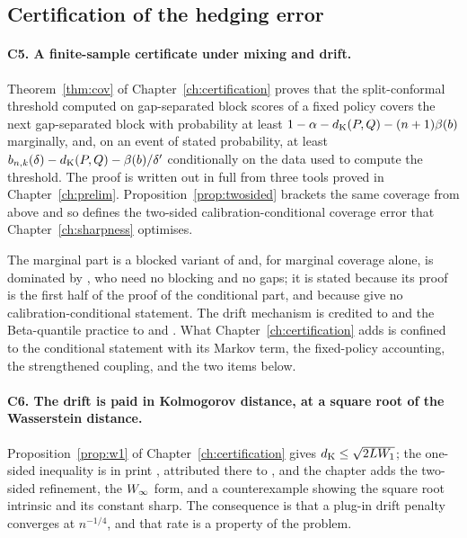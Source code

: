 \documentclass[../../../main.tex]{subfiles}
\begin{document}
\subsection{Certification of the hedging error}

\paragraph{C5. A finite-sample certificate under mixing and drift.} Theorem~\ref{thm:cov} of Chapter~\ref{ch:certification} proves that the split-conformal threshold computed on gap-separated block scores of a fixed policy covers the next gap-separated block with probability at least $1-\alpha-d_{\mathrm{K}}(P,Q)-(n+1)\beta(b)$ marginally, and, on an event of stated probability, at least $b_{n,k}(\delta)-d_{\mathrm{K}}(P,Q)-\beta(b)/\delta'$ conditionally on the data used to compute the threshold. The proof is written out in full from three tools proved in Chapter~\ref{ch:prelim}. Proposition~\ref{prop:twosided} brackets the same coverage from above and so defines the two-sided calibration-conditional coverage error that Chapter~\ref{ch:sharpness} optimises.

The marginal part is a blocked variant of \citet{oliveira2024} and, for marginal coverage alone, is dominated by \citet[Cor.~2]{barber2026}, who need no blocking and no gaps; it is stated because its proof is the first half of the proof of the conditional part, and because \citet{barber2026} give no calibration-conditional statement. The drift mechanism is credited to \citet[Prop.~13]{ramos2026} and the Beta-quantile practice to \citet[Prop.~2b, p.~479]{vovk2012} and \citet[eq.~(4), p.~2]{zwart2025}. What Chapter~\ref{ch:certification} adds is confined to the conditional statement with its Markov term, the fixed-policy accounting, the strengthened coupling, and the two items below.


\paragraph{C6. The drift is paid in Kolmogorov distance, at a square root of the Wasserstein distance.} Proposition~\ref{prop:w1} of Chapter~\ref{ch:certification} gives $d_{\mathrm{K}}\le\sqrt{2LW_1}$; the one-sided inequality is in print \citep[Prop.~1, p.~4]{xu2025}, attributed there to \citet{ross2011}, and the chapter adds the two-sided refinement, the $W_\infty$ form, and a counterexample showing the square root intrinsic and its constant sharp. The consequence is that a plug-in drift penalty converges at $n^{-1/4}$, and that rate is a property of the problem.
\end{document}
